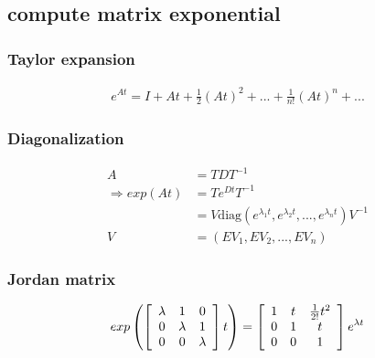\subsection{compute matrix exponential}
    \subsubsection{Taylor expansion}
        \begin{align*}
            e^{At} = I + At + \frac{1}{2}(At)^2 + ... + \frac{1}{n!}(At)^n + ...
        \end{align*}
    \subsubsection{Diagonalization}
        \begin{align*}
            A &= TDT^{-1}\\
            \Rightarrow exp(At) &= T e^{Dt} T^{-1}\\
            &= V \text{diag}(e^{\lambda_1 t}, e^{\lambda_2 t}, ..., e^{\lambda_n t}) V^{-1}\\
            V &= (EV_1, EV_2, ..., EV_n)
        \end{align*}
    \subsubsection{Jordan matrix}
        \begin{align*}
            exp\left(
                \left[
                    \begin{array}{c c c}
                        \lambda & 1 & 0\\
                        0 & \lambda & 1\\
                        0 & 0 & \lambda
                    \end{array}
                \right]
                t
            \right)
            =
            \left[
                \begin{array}{c c c}
                    1 & t & \frac{1}{2!} t^2\\
                    0 & 1 & t\\
                    0 & 0 & 1
                \end{array}
            \right]
            e^{\lambda t}
        \end{align*}
